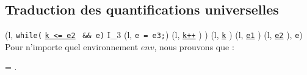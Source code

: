 \subsection{Traduction des quantifications universelles}

{
  {
     {
       {
        \cdot
          (l, \mbox{\lstinline'while('}
          \underline{\mbox{\lstinline'k <= e2'}}~ \mbox{\lstinline'&& e)'}
          \bopen
          I_3
          \cdot (l, \mbox{\lstinline'e = e3;'})
          \cdot (l, \underline{\mbox{\lstinline'k++'}} \semicolon)
          \bclose )
        \cdot
          (l, \underline{\mbox{\lstinline'k'}} \Zclear \semicolon )
        \cdot
          (l, \underline{\mbox{\lstinline'e1'}} \Zclear \semicolon )
        \cdot
          (l, \underline{\mbox{\lstinline'e2'}} \Zclear \semicolon ),
        \mbox{\lstinline'e'})
      }
    }
  }
}~\\


Pour n'importe quel environnement $env$, nous prouvons que :

 =
.


